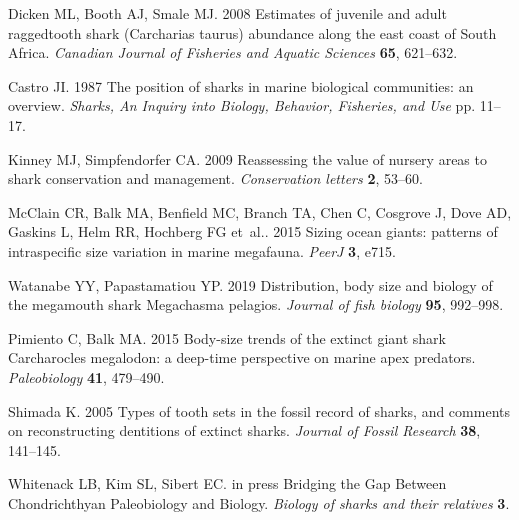 \documentclass[]{rsos}%
\begin{document}
\begin{thebibliography}{99}
Dicken ML, Booth AJ, Smale MJ. 2008  Estimates of juvenile and adult
  raggedtooth shark (Carcharias taurus) abundance along the east coast of South
  Africa. {\em Canadian Journal of Fisheries and Aquatic Sciences} \textbf{65},
  621--632.

Castro JI. 1987  The position of sharks in marine biological communities: an
  overview. {\em Sharks, An Inquiry into Biology, Behavior, Fisheries, and Use}
  pp. 11--17.

Kinney MJ, Simpfendorfer CA. 2009  Reassessing the value of nursery areas to
  shark conservation and management. {\em Conservation letters} \textbf{2},
  53--60.

McClain CR, Balk MA, Benfield MC, Branch TA, Chen C, Cosgrove J, Dove AD,
  Gaskins L, Helm RR, Hochberg FG et~al.. 2015  Sizing ocean giants: patterns
  of intraspecific size variation in marine megafauna. {\em PeerJ} \textbf{3},
  e715.

Watanabe YY, Papastamatiou YP. 2019  Distribution, body size and biology of the
  megamouth shark Megachasma pelagios. {\em Journal of fish biology}
  \textbf{95}, 992--998.

Pimiento C, Balk MA. 2015  Body-size trends of the extinct giant shark
  Carcharocles megalodon: a deep-time perspective on marine apex predators.
  {\em Paleobiology} \textbf{41}, 479--490.

Shimada K. 2005  Types of tooth sets in the fossil record of sharks, and
  comments on reconstructing dentitions of extinct sharks. {\em Journal of
  Fossil Research} \textbf{38}, 141--145.

Whitenack LB, Kim SL, Sibert EC. in press  Bridging the Gap Between
  Chondrichthyan Paleobiology and Biology. {\em Biology of sharks and their
  relatives} \textbf{3}.

\end{thebibliography}


\clearpage
\end{document}
